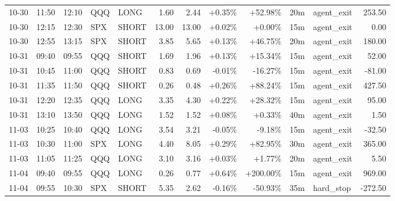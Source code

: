 \documentclass[11pt,a4paper]{article}
\begin{document}
\begin{center}
\begin{longtable}{>{\color{txtmain}}l l l l l r r r r r >{\color{txtmain}}l r}
10-30 & 11:50 & 12:10 & QQQ & LONG & 1.60 & 2.44 & \textcolor{wingreen}{+0.35\%} & \textcolor{wingreen}{+52.98\%} & 20m & agent\_exit & \textcolor{wingreen}{253.50} \\
10-30 & 12:15 & 12:30 & SPX & SHORT & 13.00 & 13.00 & \textcolor{wingreen}{+0.02\%} & \textcolor{wingreen}{+0.00\%} & 15m & agent\_exit & \textcolor{wingreen}{0.00} \\
10-30 & 12:55 & 13:15 & SPX & SHORT & 3.85 & 5.65 & \textcolor{wingreen}{+0.13\%} & \textcolor{wingreen}{+46.75\%} & 20m & agent\_exit & \textcolor{wingreen}{180.00} \\
10-31 & 09:40 & 09:55 & QQQ & SHORT & 1.69 & 1.96 & \textcolor{wingreen}{+0.13\%} & \textcolor{wingreen}{+15.34\%} & 15m & agent\_exit & \textcolor{wingreen}{52.00} \\
10-31 & 10:45 & 11:00 & QQQ & SHORT & 0.83 & 0.69 & \textcolor{lossred}{-0.01\%} & \textcolor{lossred}{-16.27\%} & 15m & agent\_exit & \textcolor{lossred}{-81.00} \\
10-31 & 11:35 & 11:50 & QQQ & SHORT & 0.26 & 0.48 & \textcolor{wingreen}{+0.26\%} & \textcolor{wingreen}{+88.24\%} & 15m & agent\_exit & \textcolor{wingreen}{427.50} \\
10-31 & 12:20 & 12:35 & QQQ & LONG & 3.35 & 4.30 & \textcolor{wingreen}{+0.22\%} & \textcolor{wingreen}{+28.32\%} & 15m & agent\_exit & \textcolor{wingreen}{95.00} \\
10-31 & 13:10 & 13:50 & QQQ & LONG & 1.52 & 1.52 & \textcolor{wingreen}{+0.08\%} & \textcolor{wingreen}{+0.33\%} & 40m & agent\_exit & \textcolor{wingreen}{1.50} \\
11-03 & 10:25 & 10:40 & QQQ & LONG & 3.54 & 3.21 & \textcolor{lossred}{-0.05\%} & \textcolor{lossred}{-9.18\%} & 15m & agent\_exit & \textcolor{lossred}{-32.50} \\
11-03 & 10:30 & 11:00 & SPX & LONG & 4.40 & 8.05 & \textcolor{wingreen}{+0.29\%} & \textcolor{wingreen}{+82.95\%} & 30m & agent\_exit & \textcolor{wingreen}{365.00} \\
11-03 & 11:05 & 11:25 & QQQ & LONG & 3.10 & 3.16 & \textcolor{wingreen}{+0.03\%} & \textcolor{wingreen}{+1.77\%} & 20m & agent\_exit & \textcolor{wingreen}{5.50} \\
11-04 & 09:40 & 09:55 & QQQ & LONG & 0.26 & 0.77 & \textcolor{wingreen}{+0.64\%} & \textcolor{wingreen}{+200.00\%} & 15m & agent\_exit & \textcolor{wingreen}{969.00} \\
11-04 & 09:55 & 10:30 & SPX & SHORT & 5.35 & 2.62 & \textcolor{lossred}{-0.16\%} & \textcolor{lossred}{-50.93\%} & 35m & hard\_stop & \textcolor{lossred}{-272.50} \\

\end{longtable}
\end{center}
\end{document}
